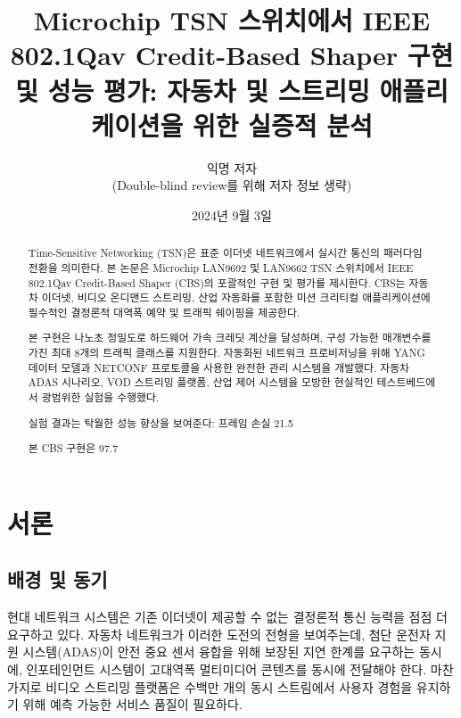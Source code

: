 \documentclass[twocolumn,10pt]{article}
\title{Microchip TSN 스위치에서 IEEE 802.1Qav Credit-Based Shaper 구현 및 성능 평가: 자동차 및 스트리밍 애플리케이션을 위한 실증적 분석}
\author{익명 저자\\
(Double-blind review를 위해 저자 정보 생략)}
\date{2024년 9월 3일}
\begin{document}
\maketitle

\begin{abstract}
Time-Sensitive Networking (TSN)은 표준 이더넷 네트워크에서 실시간 통신의 패러다임 전환을 의미한다. 본 논문은 Microchip LAN9692 및 LAN9662 TSN 스위치에서 IEEE 802.1Qav Credit-Based Shaper (CBS)의 포괄적인 구현 및 평가를 제시한다. CBS는 자동차 이더넷, 비디오 온디맨드 스트리밍, 산업 자동화를 포함한 미션 크리티컬 애플리케이션에 필수적인 결정론적 대역폭 예약 및 트래픽 쉐이핑을 제공한다.

본 구현은 나노초 정밀도로 하드웨어 가속 크레딧 계산을 달성하며, 구성 가능한 매개변수를 가진 최대 8개의 트래픽 클래스를 지원한다. 자동화된 네트워크 프로비저닝을 위해 YANG 데이터 모델과 NETCONF 프로토콜을 사용한 완전한 관리 시스템을 개발했다. 자동차 ADAS 시나리오, VOD 스트리밍 플랫폼, 산업 제어 시스템을 모방한 현실적인 테스트베드에서 광범위한 실험을 수행했다.

실험 결과는 탁월한 성능 향상을 보여준다: 프레임 손실 21.5%

본 CBS 구현은 97.7%
\end{abstract}

\section{서론}
\label{sec:introduction}

\subsection{배경 및 동기}

현대 네트워크 시스템은 기존 이더넷이 제공할 수 없는 결정론적 통신 능력을 점점 더 요구하고 있다. 자동차 네트워크가 이러한 도전의 전형을 보여주는데, 첨단 운전자 지원 시스템(ADAS)이 안전 중요 센서 융합을 위해 보장된 지연 한계를 요구하는 동시에, 인포테인먼트 시스템이 고대역폭 멀티미디어 콘텐츠를 동시에 전달해야 한다. 마찬가지로 비디오 스트리밍 플랫폼은 수백만 개의 동시 스트림에서 사용자 경험을 유지하기 위해 예측 가능한 서비스 품질이 필요하다.
\end{document}
